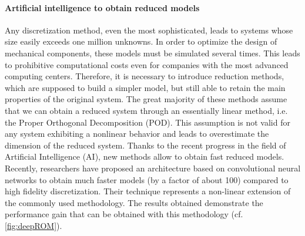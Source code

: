 \documentclass[12pt]{article}
\begin{document}
	\paragraph{\large Artificial intelligence to obtain reduced models}
	Any discretization method, even the most sophisticated, leads to systems whose size easily exceeds one million unknowns. In order to optimize the design of mechanical components, these models must be simulated several times. This leads to prohibitive computational costs even for companies with the most advanced computing centers. Therefore, it is necessary to introduce reduction methods, which are supposed to build a simpler model, but still able to retain the main properties of the original system. The great majority of these methods assume that we can obtain a reduced system through an essentially linear method, i.e. the Proper Orthogonal Decomposition (POD). This assumption is not valid for any system exhibiting a nonlinear behavior and leads to overestimate the dimension of the reduced system. Thanks to the recent progress in the field of Artificial Intelligence (AI), new methods allow to obtain fast reduced models. Recently, researchers have proposed an architecture based on convolutional neural networks to obtain much faster models (by a factor of about 100) compared to high fidelity discretization. Their technique represents a non-linear extension of the commonly used methodology. The results obtained demonstrate the performance gain that can be obtained with this methodology (cf. \ref{fig:deepROM}).
	
\end{document}
